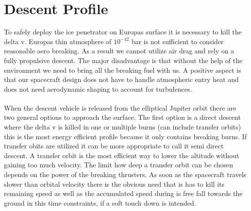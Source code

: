 \section{Descent Profile}
To safely deploy the ice penetrator on Europas surface it is necessary to kill the delta v. Europas thin atmosphere of \begin{math}10^{-{12}}\end{math} bar is not sufficient to consider reasonable aero breaking. As a result we cannot utilize air drag and rely on a fully propulsive descent. The major disadvantage is that without the help of the environment we need to bring all the breaking fuel with us. A positive aspect is that our spacecraft design does not have to handle atmospheric entry heat and does not need aerodynamic shaping to account for turbulences.\\
\\
When the descent vehicle is released from the elliptical Jupiter orbit there are two general options to approach the surface. The first option is a direct descent where the delta v is killed in one or multiple burns (can include transfer orbits)  this is the most energy efficient profile because it only contains breaking burns. If transfer obits are utilized it can be more appropriate to call it semi direct descent. A transfer orbit is the most efficient way to lower the altitude without gaining too much velocity. The limit how deep a transfer orbit can be chosen depends on the power of the breaking thrusters. As soon as the spacecraft travels slower than orbital velocity there is the obvious need that is has to kill its remaining speed as well as the accumulated speed during is free fall towards the ground in this time constraints, if a soft touch down is intended. \\

